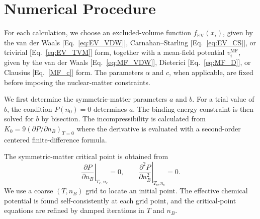 \documentclass[twocolumn,floatfix,superscriptaddress,a4paper,showkeys,nofootinbib,reprint]{revtex4-1}
\begin{document}

\appendix
\section{Numerical Procedure}
\label{app:numerics}

For each calculation, we choose an excluded-volume function
\(f_{\mathrm{EV}}(x_i)\), given by the van der Waals
[Eq.~\ref{eq:EV_VDW}], Carnahan--Starling [Eq.~\ref{eq:EV_CS}], or
trivirial [Eq.~\ref{eq:EV_TVM}] form, together with a mean-field
potential \(v_i^{\mathrm{MF}}\), given by the van der Waals
[Eq.~\ref{eq:MF_VDW}], Dieterici [Eq.~\ref{eq:MF_D}], or Clausius
[Eq.~\ref{MF_c}] form. The parameters \(\alpha\) and \(c\), when
applicable, are fixed before imposing the nuclear-matter constraints.

We first determine the symmetric-matter parameters \(a\) and \(b\).
For a trial value of \(b\), the condition \(P(n_0)=0\) determines \(a\).
The binding-energy constraint is then solved for \(b\) by bisection.
The incompressibility is calculated from $K_0 = 9(\partial P / \partial n_B)_{T=0}$ where the derivative is evaluated with a second-order centered
finite-difference formula.

The symmetric-matter critical point is obtained from
\begin{equation}
    \left.\frac{\partial P}{\partial n_B}\right|_{T_c,n_c}=0,
    \qquad
    \left.\frac{\partial^2P}{\partial n_B^2}\right|_{T_c,n_c}=0.
\end{equation}
We use a coarse \((T,n_B)\) grid to locate an initial point. The
effective chemical potential is found self-consistently at each grid
point, and the critical-point equations are refined by damped
iterations in \(T\) and \(n_B\).
\end{document}
